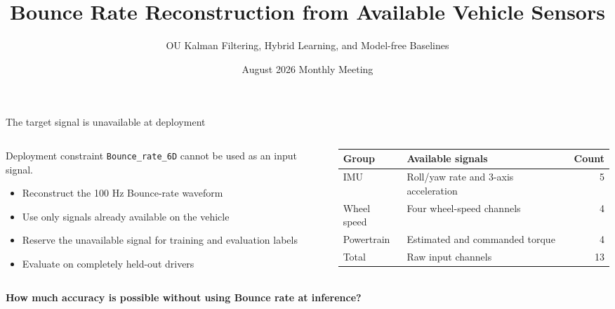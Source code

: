 \documentclass[aspectratio=169,11pt]{beamer}
\title{Bounce Rate Reconstruction from Available Vehicle Sensors}
\subtitle{OU Kalman Filtering, Hybrid Learning, and Model-free Baselines}
\date{August 2026 Monthly Meeting}
\author{}
\begin{document}
\begin{frame}
  \titlepage
\end{frame}

\begin{frame}{The target signal is unavailable at deployment}
  \begin{columns}[T,onlytextwidth]
    \begin{column}{0.48\textwidth}
      \begin{block}{Deployment constraint}
        \texttt{Bounce\_rate\_6D} cannot be used as an input signal.
      \end{block}

      \begin{itemize}
        \item Reconstruct the 100 Hz Bounce-rate waveform
        \item Use only signals already available on the vehicle
        \item Reserve the unavailable signal for training and evaluation labels
        \item Evaluate on completely held-out drivers
      \end{itemize}
    \end{column}
    \begin{column}{0.48\textwidth}
      \small
      \renewcommand{\arraystretch}{1.25}
      \begin{tabularx}{\textwidth}{@{}p{2.0cm}Yr@{}}
        \toprule
        Group & Available signals & Count\\
        \midrule
        IMU & Roll/yaw rate and 3-axis acceleration & 5\\
        Wheel speed & Four wheel-speed channels & 4\\
        Powertrain & Estimated and commanded torque & 4\\
        \midrule
        Total & Raw input channels & \alert{13}\\
        \bottomrule
      \end{tabularx}
    \end{column}
  \end{columns}

  \vspace{0.35cm}
  \centering
  \textbf{How much accuracy is possible without using Bounce rate at inference?}
\end{frame}
\end{document}

